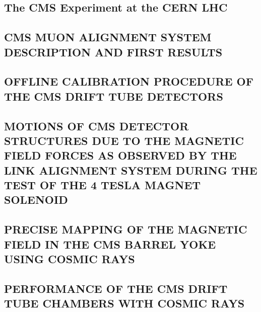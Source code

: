 \documentclass[a4paper, 11pt, twoside, openright]{report}
\begin{document}
\subsection{The CMS Experiment at the CERN LHC}


\subsection{CMS MUON ALIGNMENT SYSTEM DESCRIPTION AND FIRST RESULTS}


\subsection{OFFLINE CALIBRATION PROCEDURE OF THE CMS DRIFT TUBE DETECTORS}


\subsection{MOTIONS OF CMS DETECTOR STRUCTURES DUE TO THE MAGNETIC FIELD FORCES AS OBSERVED BY THE LINK ALIGNMENT SYSTEM DURING THE TEST OF THE 4 TESLA MAGNET SOLENOID}


\subsection{PRECISE MAPPING OF THE MAGNETIC FIELD IN THE CMS BARREL YOKE USING COSMIC RAYS}


\subsection{PERFORMANCE OF THE CMS DRIFT TUBE CHAMBERS WITH COSMIC RAYS}

\end{document}
